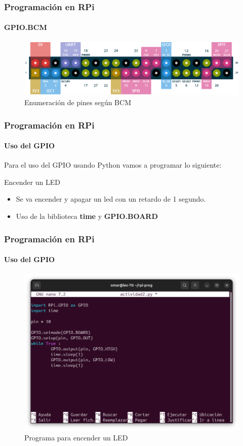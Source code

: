 \documentclass{beamer}
\begin{document}
	\begin{frame}
		\frametitle{Programación en RPi}
		\framesubtitle{GPIO.BCM}
		\begin{figure}
			\includegraphics[scale=0.34]{rpibcm2.png}
			\caption{Enumeración de pines según BCM}
		\end{figure}
	\end{frame}
	\begin{frame}
		\frametitle{Programación en RPi}
		\framesubtitle{Uso del GPIO}
		Para el uso del GPIO usando Python vamos a programar lo siguiente:
		\begin{mybox}{Encender un LED}
			\begin{itemize}
				\item Se va encender y apagar un led con un retardo de 1 segundo.
				\item Uso de la biblioteca \textbf{time} y \textbf{GPIO.BOARD}
			\end{itemize}
		\end{mybox}
	\end{frame}
	\begin{frame}
		\frametitle{Programación en RPi}
		\framesubtitle{Uso del GPIO}
		\begin{figure}
			\includegraphics[scale=0.3]{led.png}
			\caption{Programa para encender un LED}
		\end{figure}
	\end{frame}
\end{document}
